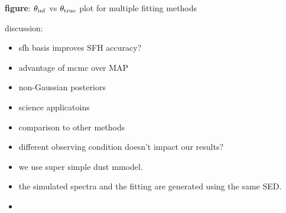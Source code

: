 {\bf figure}: $\theta_{\rm inf}$ vs $\theta_{\rm true}$ plot for multiple fitting methods 

discussion: 
\begin{itemize}
    \item sfh basis improves SFH accuracy? 
    \item advantage of mcmc over MAP
    \item non-Gaussian posteriors
    \item science applicatoins 
    \item comparison to other methods 
    \item different observing condition doesn't impact our results? 
    \item we use super simple dust mmodel.  
    \item the simulated spectra and the fitting are generated using the same
        SED. 
    \item {}
\end{itemize}

